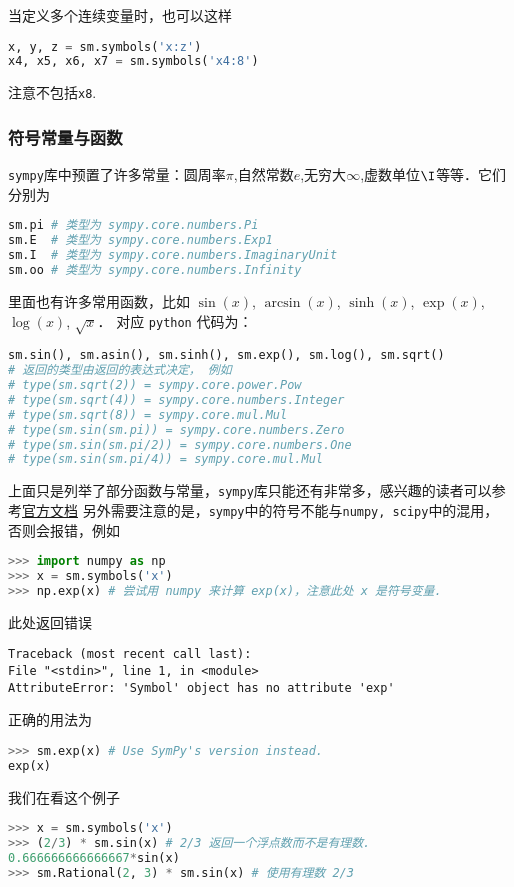 当定义多个连续变量时，也可以这样
\begin{lstlisting}[language=python]
x, y, z = sm.symbols('x:z')
x4, x5, x6, x7 = sm.symbols('x4:8')
\end{lstlisting}
注意不包括\verb|x8|.

\subsubsection{符号常量与函数}
\verb|sympy|库中预置了许多常量：圆周率$\pi$,自然常数$e$,无穷大$\infty$,虚数单位$\I$等等．它们分别为
\begin{lstlisting}[language=python]
sm.pi # 类型为 sympy.core.numbers.Pi
sm.E  # 类型为 sympy.core.numbers.Exp1
sm.I  # 类型为 sympy.core.numbers.ImaginaryUnit
sm.oo # 类型为 sympy.core.numbers.Infinity 
\end{lstlisting}
里面也有许多常用函数，比如 $\sin(x)$, $\arcsin(x)$, $\sinh(x)$, $\exp(x)$, $\log(x)$, $\sqrt{x}$． 对应 \verb|python| 代码为：
\begin{lstlisting}[language=python]
sm.sin(), sm.asin(), sm.sinh(), sm.exp(), sm.log(), sm.sqrt()
# 返回的类型由返回的表达式决定， 例如
# type(sm.sqrt(2)) = sympy.core.power.Pow
# type(sm.sqrt(4)) = sympy.core.numbers.Integer
# type(sm.sqrt(8)) = sympy.core.mul.Mul
# type(sm.sin(sm.pi)) = sympy.core.numbers.Zero
# type(sm.sin(sm.pi/2)) = sympy.core.numbers.One
# type(sm.sin(sm.pi/4)) = sympy.core.mul.Mul
\end{lstlisting}
上面只是列举了部分函数与常量，\verb|sympy|库只能还有非常多，感兴趣的读者可以参考\href{https://docs.sympy.org/latest/index.html}{官方文档}
另外需要注意的是，\verb|sympy|中的符号不能与\verb|numpy, scipy|中的混用，否则会报错，例如
\begin{lstlisting}[language=python]
>>> import numpy as np
>>> x = sm.symbols('x')
>>> np.exp(x) # 尝试用 numpy 来计算 exp(x)，注意此处 x 是符号变量.
\end{lstlisting}
此处返回错误
\begin{lstlisting}[language=none]
Traceback (most recent call last):
File "<stdin>", line 1, in <module>
AttributeError: 'Symbol' object has no attribute 'exp'
\end{lstlisting}
正确的用法为
\begin{lstlisting}[language=python]
>>> sm.exp(x) # Use SymPy's version instead.
exp(x)
\end{lstlisting}
我们在看这个例子
\begin{lstlisting}[language=python]
>>> x = sm.symbols('x')
>>> (2/3) * sm.sin(x) # 2/3 返回一个浮点数而不是有理数.
0.666666666666667*sin(x)
>>> sm.Rational(2, 3) * sm.sin(x) # 使用有理数 2/3
\end{lstlisting}
